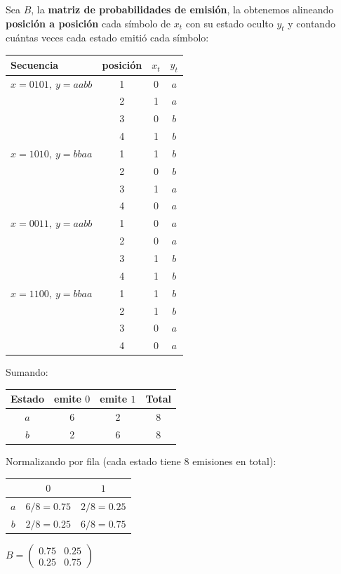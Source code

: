 Sea $B$, la \textbf{matriz de probabilidades de emisión}, la obtenemos alineando \textbf{posición a posición} cada símbolo de $x_t$ con su estado oculto $y_t$ y contando cuántas veces cada estado emitió cada símbolo:
\begin{center}
  \begin{tabular}{|l|c|c|c|}
    \hline
    Secuencia & posición & $x_t$ & $y_t$ \\
    \hline
    $x{=}0101,\ y{=}aabb$ & 1 & 0 & $a$ \\
    & 2 & 1 & $a$ \\
    & 3 & 0 & $b$ \\
    & 4 & 1 & $b$ \\
    \hline
    $x{=}1010,\ y{=}bbaa$ & 1 & 1 & $b$ \\
    & 2 & 0 & $b$ \\
    & 3 & 1 & $a$ \\
    & 4 & 0 & $a$ \\
    \hline
    $x{=}0011,\ y{=}aabb$ & 1 & 0 & $a$ \\
    & 2 & 0 & $a$ \\
    & 3 & 1 & $b$ \\
    & 4 & 1 & $b$ \\
    \hline
    $x{=}1100,\ y{=}bbaa$ & 1 & 1 & $b$ \\
    & 2 & 1 & $b$ \\
    & 3 & 0 & $a$ \\
    & 4 & 0 & $a$ \\
    \hline
  \end{tabular}
\end{center}

Sumando:
\begin{center}
  \begin{tabular}{|c|c|c|c|}
    \hline
    Estado & emite $0$ & emite $1$ & Total \\
    \hline
    $a$ & 6 & 2 & 8 \\
    $b$ & 2 & 6 & 8 \\
    \hline
  \end{tabular}
\end{center}

Normalizando por fila (cada estado tiene 8 emisiones en total):
\begin{center}
  \begin{tabular}{|c|c|c|}
    \hline
    & $0$ & $1$ \\
    \hline
    $a$ & $6/8 = 0.75$ & $2/8 = 0.25$ \\
    $b$ & $2/8 = 0.25$ & $6/8 = 0.75$ \\
    \hline
  \end{tabular}
  \qquad
  $B = \begin{pmatrix} 0.75 & 0.25 \\ 0.25 & 0.75 \end{pmatrix}$
\end{center}

